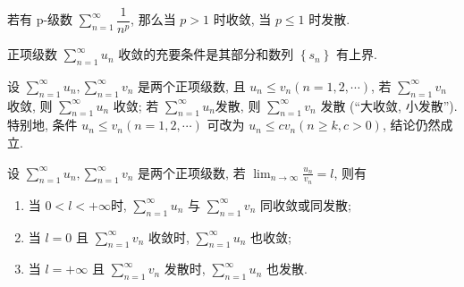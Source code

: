 \begin{definition}[p-级数]
    若有 p-级数 $\displaystyle\sum_{n=1}^{\infty}\dfrac{1}{n^p}$, 那么当 $p>1$ 时收敛, 当 $p\leqslant 1$ 时发散.
\end{definition}

\begin{theorem}[正项级数收敛的充要条件]
    正项级数 $\displaystyle  \sum_{n=1}^{\infty} u_{n} $ 收敛的充要条件是其部分和数列 $ \left\{s_{n}\right\} $ 有上界.
\end{theorem}

\begin{theorem}[比较审敛法]
    设 $\displaystyle  \sum_{n=1}^{\infty} u_{n}, \sum_{n=1}^{\infty} v_{n} $ 是两个正项级数, 且 $ u_{n} \leqslant v_{n}(n=1,2, \cdots) $,
    若 $\displaystyle  \sum_{n=1}^{\infty} v_{n} $ 收敛, 则 $\displaystyle  \sum_{n=1}^{\infty} u_{n} $ 收敛; 若 $\displaystyle  \sum_{n=1}^{\infty} u_{n}  $发散, 则 $\displaystyle \sum_{n=1}^{\infty} v_{n} $ 发散 (“大收敛, 小发散”).\\
    特别地, 条件 $ u_{n} \leqslant v_{n}(n=1,2, \cdots) $ 可改为 $ u_{n} \leqslant c v_{n}(n \geqslant k, c>0)$, 结论仍然成立.
\end{theorem}

\begin{theorem}[比较审敛法的极限形式]
    设 $\displaystyle  \sum_{n=1}^{\infty} u_{n}, \sum_{n=1}^{\infty} v_{n} $ 是两个正项级数, 若 $\displaystyle  \lim _{n \to \infty} \frac{u_{n}}{v_{n}}=l $, 则有
    \begin{enumerate}[label=(\arabic{*})]
        \item 当 $ 0<l<+\infty  $时, $\displaystyle \sum_{n=1}^{\infty} u_{n} $ 与 $\displaystyle  \sum_{n=1}^{\infty} v_{n} $ 同收敛或同发散;
        \item 当 $ l=0 $ 且 $\displaystyle  \sum_{n=1}^{\infty} v_{n} $ 收敛时, $\displaystyle  \sum_{n=1}^{\infty} u_{n} $ 也收敛;
        \item 当 $ l=+\infty $ 且 $\displaystyle  \sum_{n=1}^{\infty} v_{n} $ 发散时, $\displaystyle \sum_{n=1}^{\infty} u_{n} $ 也发散.
    \end{enumerate}
\end{theorem}

